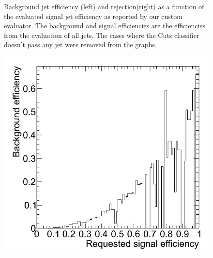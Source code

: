 \begin{figure}[h]
\begin{center}
\begin{minipage}{.3\textwidth}
    \end{minipage}
  \end{center}
  \caption{Background jet efficiency (left) and rejection(right) as a
    function of the evaluated signal jet efficiency as reported by our
    custom evaluator. The background and signal efficiencies are the
    efficiencies from the evaluation of all jets. The cases where the
    Cuts classifier doesn't pass any jet were removed from the graphs.}
  \label{fig:mkCutsEvalRoc}
\end{figure}

\begin{figure}[h]
  \begin{center}
    \begin{minipage}{.3\textwidth}
      \includegraphics[width=\textwidth]{images/mk_cuts-eval-effB}
    \end{minipage}
    \hspace{.02\textwidth}
    \begin{minipage}{.3\textwidth}

\end{minipage}
\end{center}
\end{figure}
